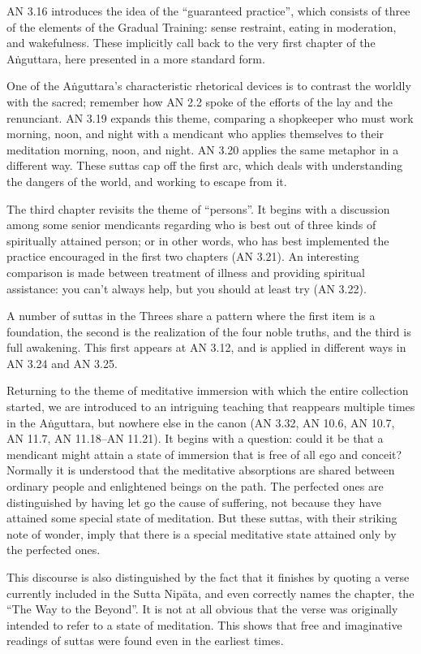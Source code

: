 \documentclass[12pt,openany]{book}%
\begin{document}
AN 3.16 introduces the idea of the “guaranteed practice”, which consists of three of the elements of the Gradual Training: sense restraint, eating in moderation, and wakefulness. These implicitly call back to the very first chapter of the \textsanskrit{Aṅguttara}, here presented in a more standard form.

One of the \textsanskrit{Aṅguttara}’s characteristic rhetorical devices is to contrast the worldly with the sacred; remember how AN 2.2 spoke of the efforts of the lay and the renunciant. AN 3.19 expands this theme, comparing a shopkeeper who must work morning, noon, and night with a mendicant who applies themselves to their meditation morning, noon, and night. AN 3.20 applies the same metaphor in a different way. These suttas cap off the first arc, which deals with understanding the dangers of the world, and working to escape from it.

The third chapter revisits the theme of “persons”. It begins with a discussion among some senior mendicants regarding who is best out of three kinds of spiritually attained person; or in other words, who has best implemented the practice encouraged in the first two chapters (AN 3.21). An interesting comparison is made between treatment of illness and providing spiritual assistance: you can’t always help, but you should at least try (AN 3.22).

A number of suttas in the Threes share a pattern where the first item is a foundation, the second is the realization of the four noble truths, and the third is full awakening. This first appears at AN 3.12, and is applied in different ways in AN 3.24 and AN 3.25.

Returning to the theme of meditative immersion with which the entire collection started, we are introduced to an intriguing teaching that reappears multiple times in the \textsanskrit{Aṅguttara}, but nowhere else in the canon (AN 3.32, AN 10.6, AN 10.7, AN 11.7, AN 11.18–AN 11.21). It begins with a question: could it be that a mendicant might attain a state of immersion that is free of all ego and conceit? Normally it is understood that the meditative absorptions are shared between ordinary people and enlightened beings on the path. The perfected ones are distinguished by having let go the cause of suffering, not because they have attained some special state of meditation. But these suttas, with their striking note of wonder, imply that there is a special meditative state attained only by the perfected ones.

This discourse is also distinguished by the fact that it finishes by quoting a verse currently included in the Sutta \textsanskrit{Nipāta}, and even correctly names the chapter, the “The Way to the Beyond”. It is not at all obvious that the verse was originally intended to refer to a state of meditation. This shows that free and imaginative readings of suttas were found even in the earliest times.
\end{document}

